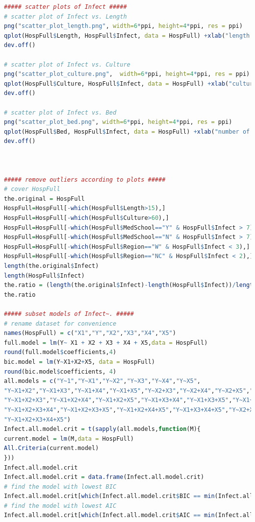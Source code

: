 \documentclass[a4paper,11pt,onecolumn,twoside]{article}
\begin{document}
\begin{lstlisting}[language=R,caption={R script for Project 1}]
##### scatter plots of Infect #####
# scatter plot of Infect vs. Length
png("scatter_plot_length.png", width=6*ppi, height=4*ppi, res = ppi)
qplot(HospFull$Length, HospFull$Infect, data = HospFull) +xlab("length of stay") + ylab("probability of acquiring infection")
dev.off()

# scatter plot of Infect vs. Culture
png("scatter_plot_culture.png",  width=6*ppi, height=4*ppi, res = ppi)
qplot(HospFull$Culture, HospFull$Infect, data = HospFull) +xlab("culture/patients * 100") + ylab("probability of acquiring infection")
dev.off()

# scatter plot of Infect vs. Bed
png("scatter_plot_bed.png", width=6*ppi, height=4*ppi, res = ppi)
qplot(HospFull$Bed, HospFull$Infect, data = HospFull) +xlab("number of beds") + ylab("probability of acquiring infection")
dev.off()



##### remove outliers according to plots #####
# cover HospFull
the.original = HospFull
HospFull=HospFull[-which(HospFull$Length>15),]
HospFull=HospFull[-which(HospFull$Culture>60),]
HospFull=HospFull[-which(HospFull$MedSchool=="Y" & HospFull$Infect > 7),]
HospFull=HospFull[-which(HospFull$MedSchool=="N" & HospFull$Infect > 7),]
HospFull=HospFull[-which(HospFull$Region=="W" & HospFull$Infect < 3),]
HospFull=HospFull[-which(HospFull$Region=="NC" & HospFull$Infect < 2),]
length(the.original$Infect)
length(HospFull$Infect)
the.ratio = (length(the.original$Infect)-length(HospFull$Infect))/length(the.original$Infect)
the.ratio

##### subset models of Infect~. #####
# rename dataset for convenience
names(HospFull) = c("X1","Y","X2","X3","X4","X5")
full.model = lm(Y~ X1 + X2 + X3 + X4 + X5,data = HospFull)
round(full.model$coefficients,4)
bic.model = lm(Y~X1+X2+X5, data = HospFull)
round(bic.model$coefficients, 4)
all.models = c("Y~1","Y~X1","Y~X2","Y~X3","Y~X4","Y~X5",
"Y~X1+X2","Y~X1+X3","Y~X1+X4","Y~X1+X5","Y~X2+X3","Y~X2+X4","Y~X2+X5","Y~X3+X4","Y~X3+X5","Y~X4+X5",
"Y~X1+X2+X3","Y~X1+X2+X4","Y~X1+X2+X5","Y~X1+X3+X4","Y~X1+X3+X5","Y~X1+X4+X5","Y~X2+X3+X4","Y~X2+X3+X5","Y~X2+X4+X5","Y~X3+X4+X5",
"Y~X1+X2+X3+X4","Y~X1+X2+X3+X5","Y~X1+X2+X4+X5","Y~X1+X3+X4+X5","Y~X2+X3+X4+X5",
"Y~X1+X2+X3+X4+X5")
Infect.all.model.crit = t(sapply(all.models,function(M){
current.model = lm(M,data = HospFull)
All.Criteria(current.model)
}))
Infect.all.model.crit
Infect.all.model.crit = data.frame(Infect.all.model.crit)
# find the model with lowest BIC
Infect.all.model.crit[which(Infect.all.model.crit$BIC == min(Infect.all.model.crit[,5])),]
# find the model with lowest AIC
Infect.all.model.crit[which(Infect.all.model.crit$AIC == min(Infect.all.model.crit[,4])),]



\end{lstlisting}
\end{document}
